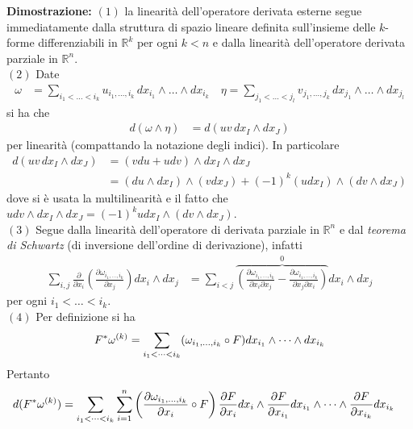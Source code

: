 \documentclass{article}
\begin{document}
\textbf{Dimostrazione:} $(1)$ la linearità dell'operatore derivata esterne segue immediatamente dalla struttura di spazio lineare definita sull'insieme delle $k$-forme differenziabili in $\mathbb{R}^k$ per ogni $k < n$ e dalla linearità dell'operatore derivata parziale in $\mathbb{R}^n$. \\
$(2)$ Date
\begin{align*}
    \omega &= \sum_{i_1 < \dots < i_k} u_{i_1, \dots, i_k} \, dx_{i_1} \wedge \dots \wedge dx_{i_k} \quad \eta = \sum_{j_1 < \dots < j_l} v_{j_1, \dots, j_k} \, dx_{j_1} \wedge \dots \wedge dx_{j_l} \tag{5.10.8}
\end{align*}
si ha che
\begin{align*}
    d(\omega \wedge \eta) &= d(uv \, dx_I \wedge dx_J) \tag{5.10.9}
\end{align*}
per linearità (compattando la notazione degli indici). In particolare
\begin{align*}
    d(uv \, dx_I \wedge dx_J) &= (vdu + udv) \wedge dx_I \wedge dx_J \\
    &= (du \wedge dx_I) \wedge (vdx_J) + (-1)^k(udx_I) \wedge (dv \wedge dx_J) \tag{5.10.10}
\end{align*}
dove si è usata la multilinearità e il fatto che $udv \wedge dx_I \wedge dx_J = (-1)^k udx_I \wedge (dv \wedge dx_J)$. \\
$(3)$ Segue dalla linearità dell'operatore di derivata parziale in $\mathbb{R}^n$ e dal \textit{teorema di Schwartz} (di inversione dell'ordine di derivazione), infatti
\begin{align}
    \sum_{i, j}\frac{\partial}{\partial x_i}\left(\frac{\partial \omega_{i_1, \dots, i_k}}{\partial x_j}\right)dx_i \wedge dx_j &= \sum_{i < j}\overbrace{\left(\frac{\partial \omega_{i_1, \dots, i_k}}{\partial x_i\partial x_j} - \frac{\partial \omega_{i_1, \dots, i_k}}{\partial x_j \partial x_i}\right)}^{0}dx_i \wedge dx_j \tag{5.10.11}
\end{align}
per ogni $i_1 < \dots < i_k$. \\
$(4)$ Per definizione si ha
\begin{align}
    F^*\omega^{(k)} = \sum_{i_1 < \dots < i_k} (\omega_{i_1, \dots, i_k} \circ F) dx_{i_1} \wedge \dots \wedge dx_{i_k} \notag
\end{align}
Pertanto
\begin{align}
    d(F^*\omega^{(k)}) &= \sum_{i_1 < \dots < i_k}\sum_{i = 1}^n \left(\frac{\partial \omega_{i_1, \dots, i_k}}{\partial x_i} \circ F\right)\frac{\partial F}{\partial x_i} dx_i \wedge \frac{\partial F}{\partial x_{i_1}}dx_{i_1} \wedge \dots \wedge \frac{\partial F}{\partial x_{i_k}}dx_{i_k} \notag
\end{align}
\end{document}
